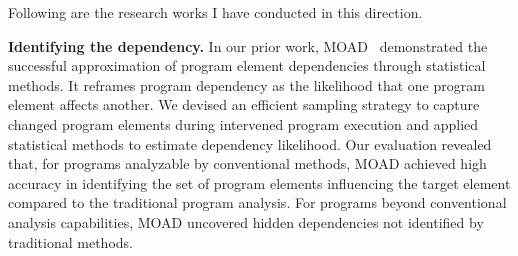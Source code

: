 \documentclass{article}
\begin{document}


\vspace{0.5em} \noindent
Following are the research works I have conducted in this direction.

\vspace{0.5em}
\noindent\textbf{Identifying the dependency.}
In our prior work, MOAD~\cite{leeObservationbasedApproximateDependency2021} demonstrated the successful approximation of program element dependencies through statistical methods. It reframes program dependency as the likelihood that one program element affects another. We devised an efficient sampling strategy to capture changed program elements during intervened program execution and applied statistical methods to estimate dependency likelihood.
% 
Our evaluation revealed that, for programs analyzable by conventional methods, MOAD achieved high accuracy in identifying the set of program elements influencing the target element compared to the traditional program analysis. For programs beyond conventional analysis capabilities, MOAD uncovered hidden dependencies not identified by traditional methods.
\end{document}
